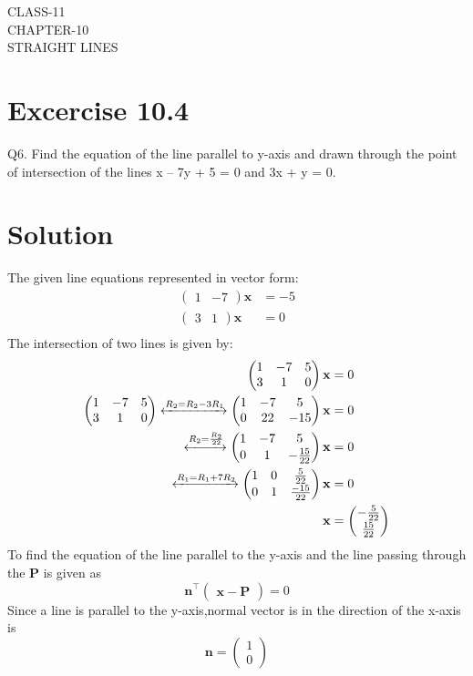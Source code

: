 \documentclass[12pt]{article}
\newcommand{\myvec}[1]{\ensuremath{\begin{pmatrix}#1\end{pmatrix}}}
\let\vec\mathbf
\begin{document}
\begin{center}
\textbf\large{CLASS-11 \\ CHAPTER-10 \\ STRAIGHT LINES}
\end{center}
\section*{Excercise 10.4}

Q6. Find the equation of the line parallel to y-axis and drawn through the point of
intersection of the lines x – 7y + 5 = 0 and 3x + y = 0.
\section*{Solution}
The given line equations represented in vector form:
\begin{align}
\myvec{1&-7}\vec{x}&=-5\\
\myvec{3&1}\vec{x}&=0\\
\end{align}
The intersection of two lines is given by:
\begin{align}
\myvec{
1&-7&5\\
3&1&0
} \vec{x}&=0\\
\myvec{
1&-7&5\\
3&1&0
}
\xleftrightarrow[]{R_2=R_2-3R_1}
\myvec{
1&-7&5\\
0&22&-15
}\vec{x}&=0\\\xleftrightarrow[]{R_2=\frac{R_2}{22}}
\myvec{
	1&-7&5\\[1pt]
0&1&-\frac{15}{22}
}\vec{x}&=0\\
\xleftrightarrow[]{R_1={R_1}+7{R_2}}
\myvec{
1&0&\frac{5}{22}\\[1pt]
0&1&\frac{-15}{22}
}\vec{x}&=0 \label{eq:7}\\
	\vec{x}&=\myvec{-\frac{5}{22}\\[1pt] \frac{15}{22}}\\
\end{align}
To find the equation of the line parallel to the y-axis and the line passing through the $\vec{P}$ is given as
\begin{equation}
    \vec{n}^{\top}\myvec{\vec{x}-\vec{P}}=0
    \label{eq:line}
\end{equation}
Since a line is parallel to the y-axis,normal vector is in the direction of the x-axis is
\begin{equation}
    \vec{n}=\myvec{1\\0}
    \label{eq:normal}
\end{equation}
\end{document}
